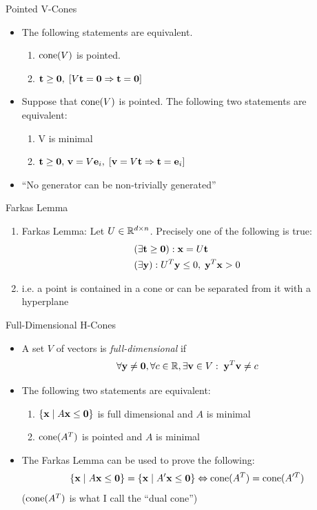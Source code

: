 \documentclass{beamer}
\begin{document}
\begin{frame}{Pointed V-Cones}
\begin{itemize}
  \item<1-> The following statements are equivalent.
    \begin{enumerate}
      \item $\operatorname{cone}(V)$ is pointed.
      \item $\mathbf{t}\geq\mathbf{0},\; [V\mathbf{t}=\mathbf{0} \Rightarrow \mathbf{t}=\mathbf{0}]$
    \end{enumerate}
	\item<2-> Suppose that $\operatorname{cone}(V)$ is pointed.  The following two statements are equivalent:
	\begin{enumerate}
		\item V is minimal
		\item $\mathbf{t}\geq\mathbf{0},\,\mathbf{v}=V\mathbf{e}_i,\; [\mathbf{v}=V\mathbf{t} \Rightarrow \mathbf{t}=\mathbf{e}_i]$
	\end{enumerate}
  \item<3-> ``No generator can be non-trivially generated''
\end{itemize}
\end{frame}

\begin{frame}{Farkas Lemma}
\begin{enumerate}
  \item<1-> Farkas Lemma:
    Let $U \in \mathbb{R}^{d\times n}$.  Precisely one of the following is true:
    \begin{align*}
       & (\exists \mathbf{t} \geq \mathbf{0}) : \mathbf{x} = U\mathbf{t}                \\
       & (\exists \mathbf{y}) : U^T\mathbf{y} \leq 0,\; \mathbf{y}^T \mathbf{x} > 0
    \end{align*}
  \item<2-> i.e. a point is contained in a cone or can be separated from it with a hyperplane
\end{enumerate}
\end{frame}

\begin{frame}{Full-Dimensional H-Cones}
\begin{itemize}
  \item<1-> A set $V$ of vectors is \textit{full-dimensional} if 
  \[ \forall\mathbf{y}\neq\mathbf{0}, \forall c\in\mathbb{R}, \exists \mathbf{v} \in V:\; \mathbf{y}^T \mathbf{v} \neq c \]
  \item<2->The following two statements are equivalent:
    \begin{enumerate}
      \item $\left\{\mathbf{x}\;|\; A\mathbf{x}\leq\mathbf{0}\right\}$ is full dimensional and $A$ is minimal
      \item $\operatorname{cone}(A^T)$ is pointed and $A$ is minimal
    \end{enumerate}
  \item<3-> The Farkas Lemma can be used to prove the following: 
    \[\left\{\mathbf{x}\;|\; A\mathbf{x}\leq\mathbf{0}\right\} = \left\{\mathbf{x}\;|\; A'\mathbf{x}\leq\mathbf{0}\right\} \Leftrightarrow \operatorname{cone}(A^T) = \operatorname{cone}(A'^T)\]
    ($\operatorname{cone}(A^T)$ is what I call the ``dual cone'')
\end{itemize}
\end{frame}
\end{document}
